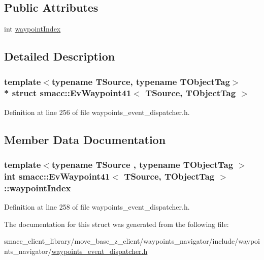 \subsection*{Public Attributes}
\begin{DoxyCompactItemize}
\item 
int \hyperlink{structsmacc_1_1EvWaypoint41_a1aabe92ce263f0572ce66891bb068d50}{waypoint\+Index}
\end{DoxyCompactItemize}


\subsection{Detailed Description}
\subsubsection*{template$<$typename T\+Source, typename T\+Object\+Tag$>$\\*
struct smacc\+::\+Ev\+Waypoint41$<$ T\+Source, T\+Object\+Tag $>$}



Definition at line 256 of file waypoints\+\_\+event\+\_\+dispatcher.\+h.



\subsection{Member Data Documentation}
\subsubsection[{\texorpdfstring{waypoint\+Index}{waypointIndex}}]{\setlength{\rightskip}{0pt plus 5cm}template$<$typename T\+Source , typename T\+Object\+Tag $>$ int {\bf smacc\+::\+Ev\+Waypoint41}$<$ T\+Source, T\+Object\+Tag $>$\+::waypoint\+Index}\hypertarget{structsmacc_1_1EvWaypoint41_a1aabe92ce263f0572ce66891bb068d50}{}\label{structsmacc_1_1EvWaypoint41_a1aabe92ce263f0572ce66891bb068d50}


Definition at line 258 of file waypoints\+\_\+event\+\_\+dispatcher.\+h.



The documentation for this struct was generated from the following file\+:\begin{DoxyCompactItemize}
\item 
smacc\+\_\+client\+\_\+library/move\+\_\+base\+\_\+z\+\_\+client/waypoints\+\_\+navigator/include/waypoints\+\_\+navigator/\hyperlink{waypoints__event__dispatcher_8h}{waypoints\+\_\+event\+\_\+dispatcher.\+h}\end{DoxyCompactItemize}
